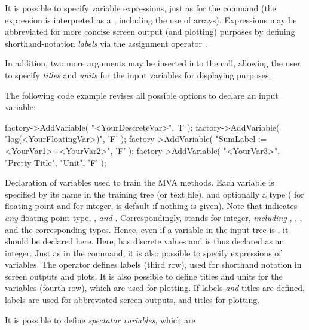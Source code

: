 It is possible to specify variable expressions, just as for the  
command (the expression is interpreted as a , including the use 
of arrays). Expressions may be abbreviated for more concise screen output (and plotting) 
purposes by defining shorthand-notation {\em labels} via the assignment operator \code{:=}. 

In addition, two more arguments may be inserted into the  
call, allowing the user to specify {\em titles} and {\em units} for the input variables 
for displaying purposes.

The following code example revises all possible options to declare an input variable:
\begin{codeexample}
\begin{tmvacode}
factory->AddVariable( "<YourDescreteVar>",                  'I' );
factory->AddVariable( "log(<YourFloatingVar>)",             'F' );
factory->AddVariable( "SumLabel := <YourVar1>+<YourVar2>",  'F' );
factory->AddVariable( "<YourVar3>", "Pretty Title", "Unit", 'F' );
\end{tmvacode}
\caption[.]{\codeexampleCaptionSize Declaration of variables used to train the
            MVA methods. Each variable is specified by its name in the training 
            tree (or text file), and optionally a type ( for 
            floating point and  for integer,  is default if 
            nothing is given). Note that  indicates {\em any} floating point
            type, \ie,  {\em and} . Correspondingly, 
            stands for integer, {\em including} , , ,
            and the corresponding  types. Hence, even if a variable in 
            the input tree is , it should be declared  here.             
            Here,  has discrete values and is thus declared 
            as an integer. Just as in the  command, it 
            is also possible to specify expressions of variables. The \code{:=} operator
            defines labels (third row), used for shorthand notation in screen outputs
            and plots. It is also possible to define titles and units for the variables
            (fourth row), which are used for plotting. If labels {\em and} titles are 
            defined, labels are used for abbreviated screen outputs, and titles for plotting. 
}
\label{ce:addvariable}
\end{codeexample}
It is possible to define {\em spectator variables}, which are 
